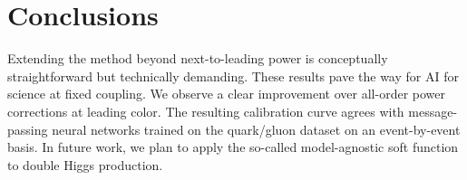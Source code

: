 \section{Conclusions}\label{sec:conclusions}

Extending the method beyond next-to-leading power is conceptually
straightforward but technically demanding. These results pave the way
for AI for science at fixed coupling. We observe a clear improvement
over all-order power corrections at leading color. The resulting
calibration curve agrees with message-passing neural networks trained on
the quark/gluon dataset on an event-by-event basis. In future work, we
plan to apply the so-called model-agnostic soft function to double Higgs
production.

